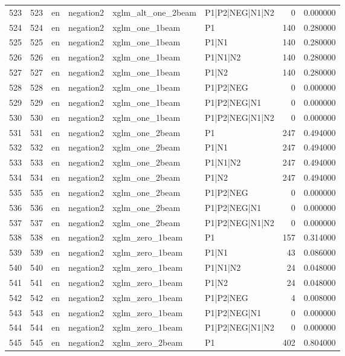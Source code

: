 \begin{tabular}{lrllllrr}
523 & 523 & en & negation2 & xglm_alt_one_2beam & P1|P2|NEG|N1|N2 & 0 & 0.000000 \\
524 & 524 & en & negation2 & xglm_one_1beam & P1 & 140 & 0.280000 \\
525 & 525 & en & negation2 & xglm_one_1beam & P1|N1 & 140 & 0.280000 \\
526 & 526 & en & negation2 & xglm_one_1beam & P1|N1|N2 & 140 & 0.280000 \\
527 & 527 & en & negation2 & xglm_one_1beam & P1|N2 & 140 & 0.280000 \\
528 & 528 & en & negation2 & xglm_one_1beam & P1|P2|NEG & 0 & 0.000000 \\
529 & 529 & en & negation2 & xglm_one_1beam & P1|P2|NEG|N1 & 0 & 0.000000 \\
530 & 530 & en & negation2 & xglm_one_1beam & P1|P2|NEG|N1|N2 & 0 & 0.000000 \\
531 & 531 & en & negation2 & xglm_one_2beam & P1 & 247 & 0.494000 \\
532 & 532 & en & negation2 & xglm_one_2beam & P1|N1 & 247 & 0.494000 \\
533 & 533 & en & negation2 & xglm_one_2beam & P1|N1|N2 & 247 & 0.494000 \\
534 & 534 & en & negation2 & xglm_one_2beam & P1|N2 & 247 & 0.494000 \\
535 & 535 & en & negation2 & xglm_one_2beam & P1|P2|NEG & 0 & 0.000000 \\
536 & 536 & en & negation2 & xglm_one_2beam & P1|P2|NEG|N1 & 0 & 0.000000 \\
537 & 537 & en & negation2 & xglm_one_2beam & P1|P2|NEG|N1|N2 & 0 & 0.000000 \\
538 & 538 & en & negation2 & xglm_zero_1beam & P1 & 157 & 0.314000 \\
539 & 539 & en & negation2 & xglm_zero_1beam & P1|N1 & 43 & 0.086000 \\
540 & 540 & en & negation2 & xglm_zero_1beam & P1|N1|N2 & 24 & 0.048000 \\
541 & 541 & en & negation2 & xglm_zero_1beam & P1|N2 & 24 & 0.048000 \\
542 & 542 & en & negation2 & xglm_zero_1beam & P1|P2|NEG & 4 & 0.008000 \\
543 & 543 & en & negation2 & xglm_zero_1beam & P1|P2|NEG|N1 & 0 & 0.000000 \\
544 & 544 & en & negation2 & xglm_zero_1beam & P1|P2|NEG|N1|N2 & 0 & 0.000000 \\
545 & 545 & en & negation2 & xglm_zero_2beam & P1 & 402 & 0.804000 \\

\end{tabular}
